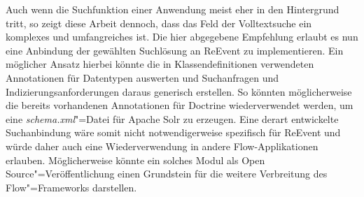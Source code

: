 Auch wenn die Suchfunktion einer Anwendung meist eher in den Hintergrund tritt, so zeigt diese Arbeit dennoch, dass das Feld der Volltextsuche ein komplexes und umfangreiches ist. Die hier abgegebene Empfehlung erlaubt es nun eine Anbindung der gewählten Suchlösung an ReEvent zu implementieren. Ein möglicher Ansatz hierbei könnte die in Klassendefinitionen verwendeten Annotationen für Datentypen auswerten und Suchanfragen und Indizierungsanforderungen daraus generisch erstellen. So könnten möglicherweise die bereits vorhandenen Annotationen für Doctrine wiederverwendet werden, um eine \emph{schema.xml}"=Datei für Apache Solr zu erzeugen. Eine derart entwickelte Suchanbindung wäre somit nicht notwendigerweise spezifisch für ReEvent und würde daher auch eine Wiederverwendung in andere Flow-Applikationen erlauben. Möglicherweise könnte ein solches Modul als Open Source"=Veröffentlichung einen Grundstein für die weitere Verbreitung des Flow"=Frameworks darstellen.


